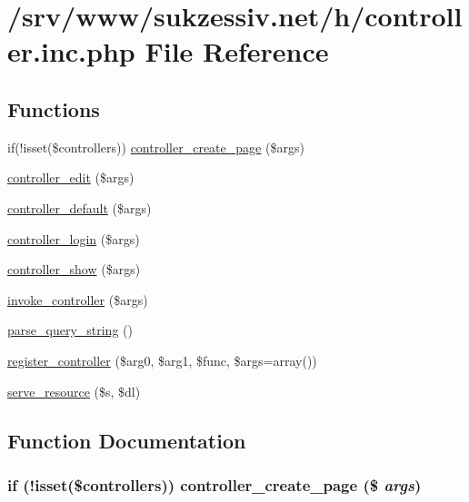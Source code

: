 \hypertarget{controller_8inc_8php}{
\section{/srv/www/sukzessiv.net/h/controller.inc.php File Reference}
\label{controller_8inc_8php}
}
\subsection*{Functions}
\begin{CompactItemize}
\item 
if(!isset(\$controllers)) \hyperlink{controller_8inc_8php_647d96ea8304771250e8fa4251a4d12e}{controller\_\-create\_\-page} (\$args)
\item 
\hyperlink{controller_8inc_8php_406fb5b2a2a93bef89e4ba46f8829d2f}{controller\_\-edit} (\$args)
\item 
\hyperlink{controller_8inc_8php_e9c67435a37f4b70d0769079c9dbf379}{controller\_\-default} (\$args)
\item 
\hyperlink{controller_8inc_8php_c3e283e26869e2ffd938bdf9775c3e81}{controller\_\-login} (\$args)
\item 
\hyperlink{controller_8inc_8php_d135971740244b9e81718d4cd0407b11}{controller\_\-show} (\$args)
\item 
\hyperlink{controller_8inc_8php_170bef82dc4636c51b678276323e4ff4}{invoke\_\-controller} (\$args)
\item 
\hyperlink{controller_8inc_8php_51a50fbc5165b4ff0a289b2010bb7597}{parse\_\-query\_\-string} ()
\item 
\hyperlink{controller_8inc_8php_543961dbcd309fa2cb6a887a8666bf1c}{register\_\-controller} (\$arg0, \$arg1, \$func, \$args=array())
\item 
\hyperlink{controller_8inc_8php_5d5274c3531eb05a1ea5927ff3cd08d3}{serve\_\-resource} (\$s, \$dl)
\end{CompactItemize}


\subsection{Function Documentation}
\hypertarget{controller_8inc_8php_647d96ea8304771250e8fa4251a4d12e}{
\subsubsection[{controller\_\-create\_\-page}]{\setlength{\rightskip}{0pt plus 5cm}if (!isset(\$controllers)) controller\_\-create\_\-page (\$ {\em args})}}
\label{controller_8inc_8php_647d96ea8304771250e8fa4251a4d12e}


